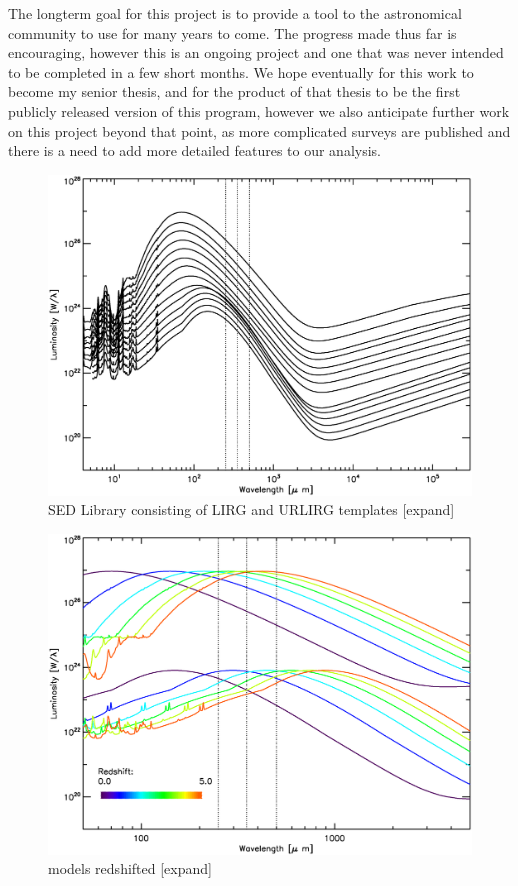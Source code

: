 \documentclass[twocolumn,letterpaper,10pt]{article}
\begin{document}
The longterm goal for this project is to provide a tool to the astronomical community to use for many years to come. The progress made thus far is encouraging, however this is an ongoing project and one that was never intended to be completed in a few short months. We hope eventually for this work to become my senior thesis, and for the product of that thesis to be the first publicly released version of this program, however we also anticipate further work on this project beyond that point, as more complicated surveys are published and there is a need to add more detailed features to our analysis.




\begin{figure}
  \includegraphics[width=\textwidth,trim=0.25in 0.25in 0.25in 0.25in,clip=true]{models.eps}
  \caption{SED Library consisting of LIRG and URLIRG templates [expand]}
  \label{slib}
\end{figure}

\begin{figure}
\includegraphics[width=\textwidth]{model_brightness.eps}
\caption{models redshifted [expand]}
\label{mshift}
\end{figure}
\end{document}
